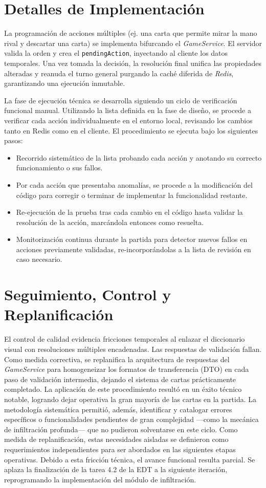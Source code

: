 \section{Detalles de Implementación}
La programación de acciones múltiples (ej. una carta que permite mirar la mano rival y descartar una carta) se implementa bifurcando el \textit{GameService}. El servidor valida la orden y crea el \texttt{pendingAction}, inyectando al cliente los datos temporales. Una vez tomada la decisión, la resolución final unifica las propiedades alteradas y reanuda el turno general purgando la caché diferida de \textit{Redis}, garantizando una ejecución inmutable.

La fase de ejecución técnica se desarrolla siguiendo un ciclo de verificación funcional manual. Utilizando la lista definida en la fase de diseño, se procede a verificar cada acción individualmente en el entorno local, revisando los cambios tanto en Redis como en el cliente. El procedimiento se ejecuta bajo los siguientes pasos:
\begin{itemize}
    \item Recorrido sistemático de la lista probando cada acción y anotando su correcto funcionamiento o sus fallos.
    \item Por cada acción que presentaba anomalías, se procede a la modificación del código para corregir o terminar de implementar la funcionalidad restante.
    \item Re-ejecución de la prueba tras cada cambio en el código hasta validar la resolución de la acción, marcándola entonces como resuelta.
    \item Monitorización continua durante la partida para detector nuevos fallos en acciones previamente validadas, re-incorporándolas a la lista de revisión en caso necesario.
\end{itemize}

\section{Seguimiento, Control y Replanificación}
El control de calidad evidencia fricciones temporales al enlazar el diccionario visual con resoluciones múltiples encadenadas. Las respuestas de validación fallan. Como medida correctiva, se replanifica la arquitectura de respuestas del \textit{GameService} para homogeneizar los formatos de transferencia (DTO) en cada paso de validación intermedia, dejando el sistema de cartas prácticamente completado. La aplicación de este procedimiento resultó en un éxito técnico notable, logrando dejar operativa la gran mayoría de las cartas en la partida. La metodología sistemática permitió, además, identificar y catalogar errores específicos o funcionalidades pendientes de gran complejidad —como la mecánica de infiltración profunda— que no pudieron solventarse en este ciclo. Como medida de replanificación, estas necesidades aisladas se definieron como requerimientos independientes para ser abordados en las siguientes etapas operativas. Debido a esta fricción técnica, el avance funcional resulta parcial. Se aplaza la finalización de la tarea 4.2 de la EDT a la siguiente iteración, reprogramando la implementación del módulo de infiltración.


